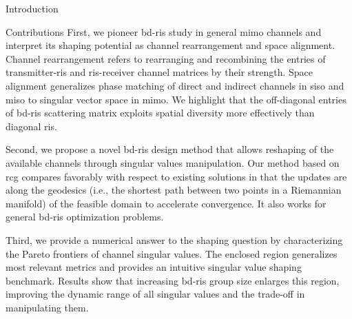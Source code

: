 \documentclass[journal]{IEEEtran}
\begin{document}
\begin{section}{Introduction}
\begin{subsection}{Contributions}
		First, we pioneer \gls{bd}-\gls{ris} study in general \gls{mimo} channels and interpret its shaping potential as channel rearrangement and space alignment.
		Channel rearrangement refers to rearranging and recombining the entries of transmitter-\gls{ris} and \gls{ris}-receiver channel matrices by their strength.
		Space alignment generalizes phase matching of direct and indirect channels in \gls{siso} and \gls{miso} to singular vector space in \gls{mimo}.
		We highlight that the off-diagonal entries of \gls{bd}-\gls{ris} scattering matrix exploits spatial diversity more effectively than diagonal \gls{ris}.

		Second, we propose a novel \gls{bd}-\gls{ris} design method that allows reshaping of the available channels through singular values manipulation.
		Our method based on \gls{rcg} compares favorably with respect to existing solutions in that the updates are along the geodesics (i.e., the shortest path between two points in a Riemannian manifold) of the feasible domain to accelerate convergence.
		It also works for general \gls{bd}-\gls{ris} optimization problems.



		Third, we provide a numerical answer to the shaping question by characterizing the Pareto frontiers of channel singular values.
		The enclosed region generalizes most relevant metrics and provides an intuitive singular value shaping benchmark.
		Results show that increasing \gls{bd}-\gls{ris} group size enlarges this region, improving the dynamic range of all singular values and the trade-off in manipulating them.



\end{subsection}
\end{section}
\end{document}
